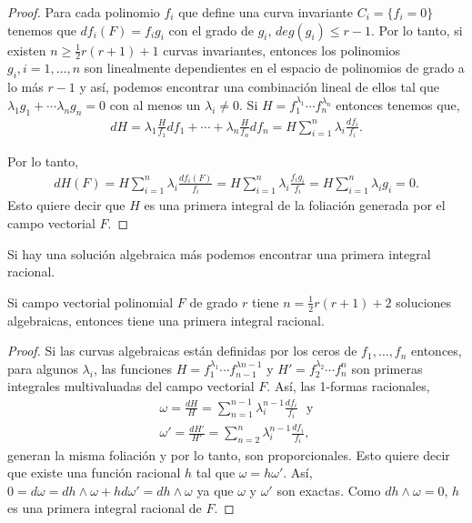 \begin{proof}
Para cada polinomio $f_{i}$ que define una curva invariante $C_{i}=\{f_{i}=0\}$ tenemos que $df_{i}(F)=f_{i}g_{i}$ con el grado de $g_{i}$, $deg(g_{i})\leq r-1$. Por lo tanto, si existen $n\geq \frac{1}{2}r(r+1)+1$ curvas invariantes, entonces los polinomios $g_{i}, i=1,\ldots,n$ son linealmente dependientes en el espacio de polinomios de grado a lo más $r-1$ y así, podemos encontrar una combinación lineal de ellos tal que $\lambda_{1}g_{1}+\cdots \lambda_{n}g_{n}=0$ con al menos un $\lambda_{i}\neq 0$. Si $H=f_{1}^{\lambda_{1}}\cdots f_{n}^{\lambda_{n}}$ entonces tenemos que,
\begin {align*}
dH=\lambda_{1}\frac{H}{f_{1}}df_{1}+\cdots+\lambda_{n}\frac{H}{f_{n}}df_{n}=H\sum_{i=1}^{n}\lambda_{i}\frac{df_{i}}{f_{i}}.
\end{align*}

\noindent Por lo tanto,
\begin{align*}
dH(F)=H\sum_{i=1}^{n}\lambda_{i}\frac{df_{i}(F)}{f_{i}}=H\sum_{i=1}^{n}\lambda_{i}\frac{f_{i}g_{i}}{f_{i}}=H\sum_{i=1}^{n}\lambda_{i}g_{i}=0.
\end{align*}
Esto quiere decir que $H$ es una primera integral de la foliación generada por el campo vectorial $F$.
\end{proof}

Si hay una solución algebraica más podemos encontrar una primera integral racional.

\begin{Teorema}
\label{Teo:Darboux}
Si campo vectorial polinomial $F$ de grado $r$ tiene $n=\frac{1}{2}r(r+1)+2$ soluciones algebraicas, entonces tiene una primera integral racional.
\end{Teorema}
\begin{proof}
Si las curvas algebraicas están definidas por los ceros de $f_{1},\ldots,f_{n}$ entonces, para algunos $\lambda_{i}$, las funciones $H=f_{1}^{\lambda_{1}}\cdots f_{n-1}^{\lambda{n-1}}$ y $H'=f_{2}^{\lambda_{2}}\cdots f_{n}^{n}$ son primeras integrales multivaluadas del campo vectorial $F$. Así, las 1-formas racionales,
\begin{align*}
\omega=\frac{dH}{H}=\sum_{n=1}^{n-1}\lambda_{i}^{n-1}\frac{df_{i}}{f_{i}}\,\,\,\, \mathrm{y}\\
\omega'=\frac{dH'}{H'}=\sum_{n=2}^{n}\lambda_{i}^{n-1}\frac{df_{i}}{f_{i}},
\end{align*}
\noindent generan la misma foliación y por lo tanto, son proporcionales. Esto quiere decir que existe una función racional $h$ tal que $\omega =h\omega'$. Así, $0=d\omega=dh\wedge \omega + hd\omega' =dh\wedge\omega$ ya que $\omega$ y $\omega'$ son exactas. Como $dh\wedge\omega =0$, $h$ es una primera integral racional de $F$.
\end{proof}

